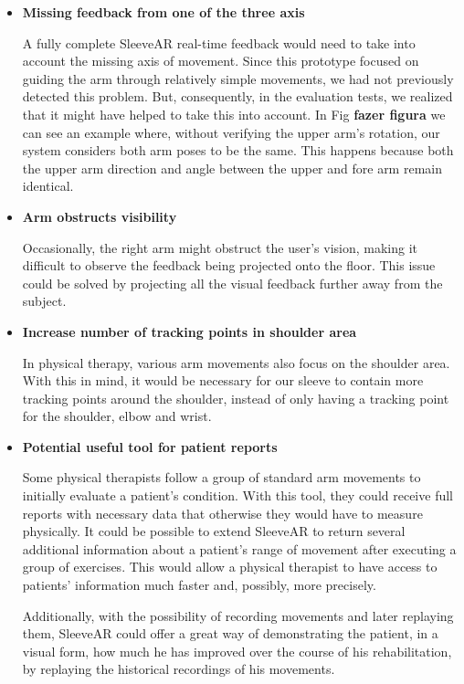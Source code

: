 \begin{itemize}
\item \textbf{Missing feedback from one of the three axis}

A fully complete SleeveAR real-time feedback would need to take into account the missing axis of movement. Since this prototype focused on guiding the arm through relatively simple movements, we had not previously detected this problem. But, consequently, in the evaluation tests, we realized that it might have helped to take this into account. In Fig \textbf{fazer figura} we can see an example where, without verifying the upper arm's rotation, our system considers both arm poses to be the same. This happens because both the upper arm direction and angle between the upper and fore arm remain identical.


\item \textbf{Arm obstructs visibility}

Occasionally, the right arm might obstruct the user's vision, making it difficult to observe the feedback being projected onto the floor. This issue could be solved by projecting all the visual feedback further away from the subject.

\item \textbf{Increase number of tracking points in shoulder area}

In physical therapy, various arm movements also focus on the shoulder area. With this in mind, it would be necessary for our sleeve to contain more tracking points around the shoulder, instead of only having a tracking point for the shoulder, elbow and wrist.

\item \textbf{Potential useful tool for patient reports}

Some physical therapists follow a group of standard arm movements to initially evaluate a patient's condition. With this tool, they could receive full reports with necessary data that otherwise they would have to measure physically. It could be possible to extend SleeveAR to return several additional information about a patient's range of movement after executing a group of exercises. This would allow a physical therapist to have access to patients' information much faster and, possibly, more precisely. 

Additionally, with the possibility of recording movements and later replaying them, SleeveAR could offer a great way of demonstrating the patient, in a visual form, how much he has improved over the course of his rehabilitation, by replaying the historical recordings of his movements.


\end{itemize}
